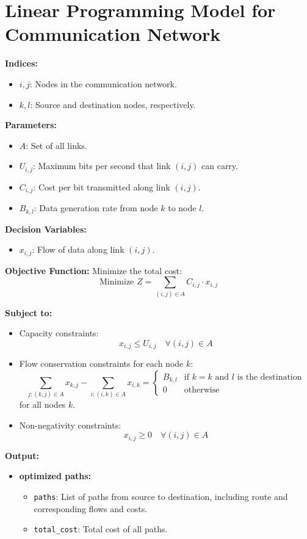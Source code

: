 \documentclass{article}
\begin{document}
\section*{Linear Programming Model for Communication Network}

\textbf{Indices:}
\begin{itemize}
    \item \(i, j\): Nodes in the communication network.
    \item \(k, l\): Source and destination nodes, respectively.
\end{itemize}

\textbf{Parameters:}
\begin{itemize}
    \item \(A\): Set of all links.
    \item \(U_{i,j}\): Maximum bits per second that link \((i, j)\) can carry.
    \item \(C_{i,j}\): Cost per bit transmitted along link \((i, j)\).
    \item \(B_{k,l}\): Data generation rate from node \(k\) to node \(l\).
\end{itemize}

\textbf{Decision Variables:}
\begin{itemize}
    \item \(x_{i,j}\): Flow of data along link \((i,j)\).
\end{itemize}

\textbf{Objective Function:}
Minimize the total cost:
\[
\text{Minimize } Z = \sum_{(i,j) \in A} C_{i,j} \cdot x_{i,j}
\]

\textbf{Subject to:}
\begin{itemize}
    \item Capacity constraints:
    \[
    x_{i,j} \leq U_{i,j} \quad \forall (i,j) \in A
    \]
    
    \item Flow conservation constraints for each node \(k\):
    \[
    \sum_{j: (k,j) \in A} x_{k,j} - \sum_{i: (i,k) \in A} x_{i,k} = 
    \begin{cases}
        B_{k,l} & \text{if } k = k \text{ and } l \text{ is the destination} \\
        0 & \text{otherwise}
    \end{cases}
    \]
    for all nodes \(k\).
    
    \item Non-negativity constraints:
    \[
    x_{i,j} \geq 0 \quad \forall (i,j) \in A
    \]
\end{itemize}

\textbf{Output:}
\begin{itemize}
    \item \textbf{optimized paths:}
        \begin{itemize}
            \item \texttt{paths}: List of paths from source to destination, including route and corresponding flows and costs.
            \item \texttt{total\_cost}: Total cost of all paths.
        \end{itemize}
\end{itemize}
\end{document}
